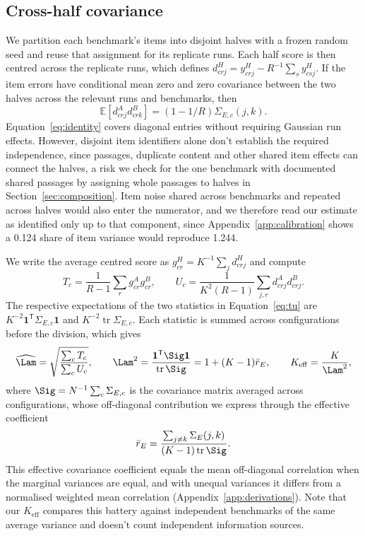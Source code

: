 \subsection{Cross-half covariance}
We partition each benchmark's items into disjoint halves with a frozen random seed and reuse that assignment for its replicate runs. Each half score is then centred across the replicate runs, which defines $d^H_{crj}=y^H_{crj}-R^{-1}\sum_s y^H_{csj}$. If the item errors have conditional mean zero and zero covariance between the two halves across the relevant runs and benchmarks, then
\begin{equation}
\mathbb{E}[d^A_{crj}d^B_{crk}]=(1-1/R)\Sigma_{E,c}(j,k).
\label{eq:identity}
\end{equation}
Equation~\ref{eq:identity} covers diagonal entries without requiring Gaussian run effects. However, disjoint item identifiers alone don't establish the required independence, since passages, duplicate content and other shared item effects can connect the halves, a risk we check for the one benchmark with documented shared passages by assigning whole passages to halves in Section~\ref{sec:composition}. Item noise shared across benchmarks and repeated across halves would also enter the numerator, and we therefore read our estimate as identified only up to that component, since Appendix~\ref{app:calibration} shows a 0.124 share of item variance would reproduce 1.244.

We write the average centred score as $g^H_{cr}=K^{-1}\sum_j d^H_{crj}$ and compute
\begin{equation}
T_c=\frac{1}{R-1}\sum_r g^A_{cr}g^B_{cr},\qquad
U_c=\frac{1}{K^2(R-1)}\sum_{j,r}d^A_{crj}d^B_{crj}.
\label{eq:tu}
\end{equation}
The respective expectations of the two statistics in Equation~\ref{eq:tu} are $K^{-2}\mathbf{1}^{\mathsf T}\Sigma_{E,c}\mathbf{1}$ and $K^{-2}\operatorname{tr}\Sigma_{E,c}$. Each statistic is summed across configurations before the division, which gives
\begin{equation}
\widehat\Lam=\sqrt{\frac{\sum_c T_c}{\sum_c U_c}},\qquad
\Lam^2=\frac{\mathbf{1}^{\mathsf T}\Sig\mathbf{1}}{\operatorname{tr}\Sig}
=1+(K-1)\bar r_E,\qquad K_{\mathrm{eff}}=\frac{K}{\Lam^2},
\label{eq:lambda}
\end{equation}
where $\Sig=N^{-1}\sum_c\Sigma_{E,c}$ is the covariance matrix averaged across configurations, whose off-diagonal contribution we express through the effective coefficient
\begin{equation}
\bar r_E=\frac{\sum_{j\ne k}\Sigma_E(j,k)}{(K-1)\operatorname{tr}\Sig}.
\label{eq:effective}
\end{equation}
This effective covariance coefficient equals the mean off-diagonal correlation when the marginal variances are equal, and with unequal variances it differs from a normalised weighted mean correlation (Appendix~\ref{app:derivations}). Note that our $K_{\mathrm{eff}}$ compares this battery against independent benchmarks of the same average variance and doesn't count independent information sources.


